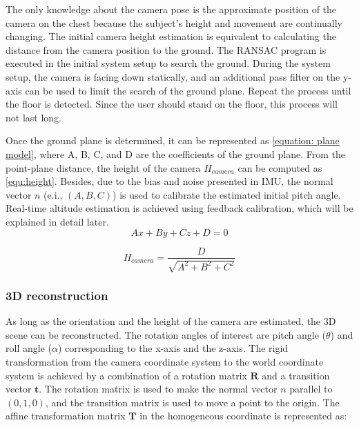 \documentclass{ieeeaccess}
\begin{document}
The only knowledge about the camera pose is the approximate position of the camera on the chest because the subject’s height and movement are continually changing. The initial camera height estimation is equivalent to calculating the distance from the camera position to the ground. The RANSAC program is executed in the initial system setup to search the ground. During the system setup, the camera is facing down statically, and an additional pass filter on the y-axis can be used to limit the search of the ground plane. Repeat the process until the floor is detected. Since the user should stand on the floor, this process will not last long.

Once the ground plane is determined, it can be represented as \eqref {equation: plane model}, where A, B, C, and D are the coefficients of the ground plane. From the point-plane distance, the height of the camera $H_{camera}$ can be computed as \eqref{equ:height}. Besides, due to the bias and noise presented in IMU, the normal vector $n$ (e.i., $(A, B, C)$) is used to calibrate the estimated initial pitch angle. Real-time altitude estimation is 
achieved using feedback calibration, which will be explained in detail later.
 \begin{equation}
Ax + By + Cz + D = 0 
\label{equation: plane model}
\end{equation}

\begin{equation}
H_{camera}=\frac{D}{\sqrt{A^2+B^2+C^2}}
\label{equ:height}
\end{equation}


\subsubsection{3D reconstruction} 
As long as the orientation and the height of the camera are estimated, the 3D scene can be reconstructed. The rotation angles of interest are pitch angle ($\theta$) and roll angle ($\alpha$) corresponding to the x-axis and the z-axis. The rigid transformation from the camera coordinate system to the world coordinate system is achieved by a combination of a rotation matrix $\textbf{R}$ and a transition vector $\textbf{t}$.  The rotation matrix is used to make the normal vector $n$ parallel to $(0, 1, 0)$, and the transition matrix is used to move a point to the origin. The affine transformation matrix $\textbf{T}$ in the homogeneous coordinate is represented as:
\end{document}

